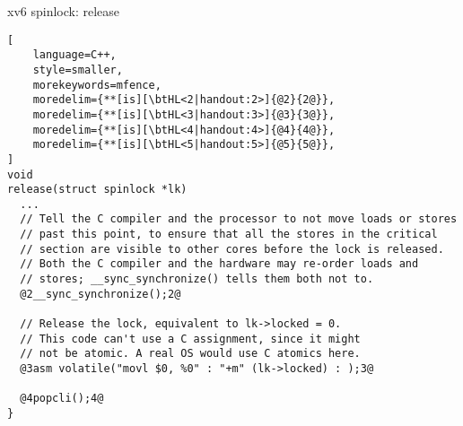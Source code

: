 \begin{frame}[fragile,label=xv6SpinlockRelease]{xv6 spinlock: release}
\begin{lstlisting}[
    language=C++,
    style=smaller,
    morekeywords=mfence,
    moredelim={**[is][\btHL<2|handout:2>]{@2}{2@}},
    moredelim={**[is][\btHL<3|handout:3>]{@3}{3@}},
    moredelim={**[is][\btHL<4|handout:4>]{@4}{4@}},
    moredelim={**[is][\btHL<5|handout:5>]{@5}{5@}},
]
void
release(struct spinlock *lk)
  ...
  // Tell the C compiler and the processor to not move loads or stores
  // past this point, to ensure that all the stores in the critical
  // section are visible to other cores before the lock is released.
  // Both the C compiler and the hardware may re-order loads and
  // stores; __sync_synchronize() tells them both not to.
  @2__sync_synchronize();2@

  // Release the lock, equivalent to lk->locked = 0.
  // This code can't use a C assignment, since it might
  // not be atomic. A real OS would use C atomics here.
  @3asm volatile("movl $0, %0" : "+m" (lk->locked) : );3@

  @4popcli();4@
}
\end{lstlisting}
\end{frame}
